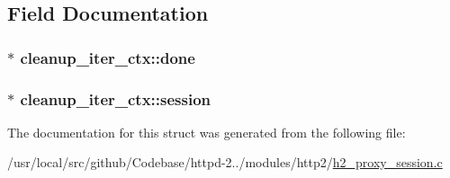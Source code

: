 \subsection{Field Documentation}
\subsubsection[{\texorpdfstring{done}{done}}]{$\ast$ cleanup\+\_\+iter\+\_\+ctx\+::done}\hypertarget{structcleanup__iter__ctx_a682d37e24a1c99450d93ee0d09329ffd}{}\label{structcleanup__iter__ctx_a682d37e24a1c99450d93ee0d09329ffd}
\subsubsection[{\texorpdfstring{session}{session}}]{$\ast$ cleanup\+\_\+iter\+\_\+ctx\+::session}\hypertarget{structcleanup__iter__ctx_a415be96abc49c1129d0f200e529302b9}{}\label{structcleanup__iter__ctx_a415be96abc49c1129d0f200e529302b9}


The documentation for this struct was generated from the following file\+:\begin{DoxyCompactItemize}
\item 
/usr/local/src/github/\+Codebase/httpd-\/2../modules/http2/\hyperlink{h2__proxy__session_8c}{h2\+\_\+proxy\+\_\+session.\+c}\end{DoxyCompactItemize}
